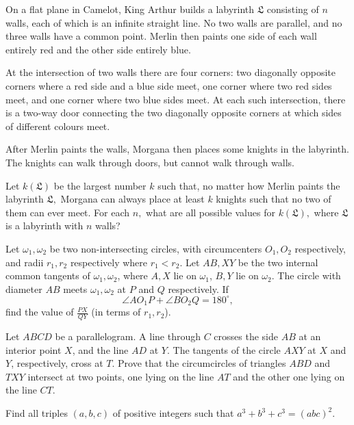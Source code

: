\documentclass[11pt]{scrartcl}
\begin{document}
\begin{problem}[2252133047011954512]
On a flat plane in Camelot, King Arthur builds a labyrinth $\mathfrak{L}$ consisting of $n$ walls, each of which is an infinite straight line. No two walls are parallel, and no three walls have a common point. Merlin then paints one side of each wall entirely red and the other side entirely blue.

At the intersection of two walls there are four corners: two diagonally opposite corners where a red side and a blue side meet, one corner where two red sides meet, and one corner where two blue sides meet. At each such intersection, there is a two-way door connecting the two diagonally opposite corners at which sides of different colours meet.

After Merlin paints the walls, Morgana then places some knights in the labyrinth. The knights can walk through doors, but cannot walk through walls.

Let $k(\mathfrak{L})$ be the largest number $k$ such that, no matter how Merlin paints the labyrinth $\mathfrak{L},$ Morgana can always place at least $k$ knights such that no two of them can ever meet. For each $n,$ what are all possible values for $k(\mathfrak{L}),$ where $\mathfrak{L}$ is a labyrinth with $n$ walls?
\end{problem}
\begin{problem}[689874125173032]
Let $\omega_1,\omega_2$ be two non-intersecting circles, with circumcenters $O_1,O_2$ respectively, and radii $r_1,r_2$ respectively where $r_1 < r_2$. Let $AB,XY$ be the two internal common tangents of $\omega_1,\omega_2$, where $A,X$ lie on $\omega_1$, $B,Y$ lie on $\omega_2$. The circle with diameter $AB$ meets $\omega_1,\omega_2$ at $P$ and $Q$ respectively. If$$\angle AO_1P+\angle BO_2Q=180^{\circ},$$find the value of $\frac{PX}{QY}$ (in terms of $r_1,r_2$).
\end{problem}
\begin{problem}[579228243242060]
Let $ABCD$ be a parallelogram. A line through $C$ crosses the side $AB$ at an interior point $X$,
and the line $AD$ at $Y$. The tangents of the circle $AXY$ at $X$ and $Y$, respectively, cross at $T$.
Prove that the circumcircles of triangles $ABD$ and $TXY$ intersect at two points, one lying on the line $AT$ and the other one lying on the line $CT$.
\end{problem}
\begin{problem}[7088779505939683183]
Find all triples $(a, b, c)$ of positive integers such that $a^3 + b^3 + c^3 = (abc)^2$.
\end{problem}
\end{document}
